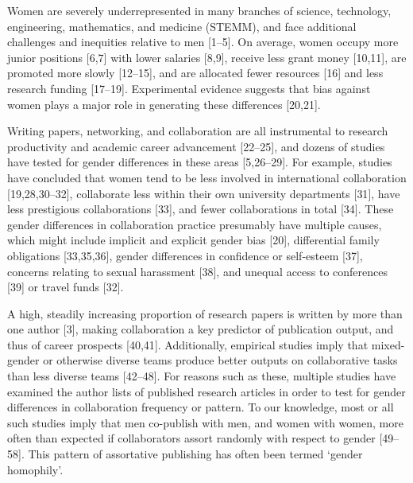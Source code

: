 \documentclass[12pt,]{article}
\begin{document}
Women are severely underrepresented in many branches of science,
technology, engineering, mathematics, and medicine (STEMM), and face
additional challenges and inequities relative to men {[}1--5{]}. On
average, women occupy more junior positions {[}6,7{]} with lower
salaries {[}8,9{]}, receive less grant money {[}10,11{]}, are promoted
more slowly {[}12--15{]}, and are allocated fewer resources {[}16{]} and
less research funding {[}17--19{]}. Experimental evidence suggests that
bias against women plays a major role in generating these differences
{[}20,21{]}.

Writing papers, networking, and collaboration are all instrumental to
research productivity and academic career advancement {[}22--25{]}, and
dozens of studies have tested for gender differences in these areas
{[}5,26--29{]}. For example, studies have concluded that women tend to
be less involved in international collaboration {[}19,28,30--32{]},
collaborate less within their own university departments {[}31{]}, have
less prestigious collaborations {[}33{]}, and fewer collaborations in
total {[}34{]}. These gender differences in collaboration practice
presumably have multiple causes, which might include implicit and
explicit gender bias {[}20{]}, differential family obligations
{[}33,35,36{]}, gender differences in confidence or self-esteem
{[}37{]}, concerns relating to sexual harassment {[}38{]}, and unequal
access to conferences {[}39{]} or travel funds {[}32{]}.

A high, steadily increasing proportion of research papers is written by
more than one author {[}3{]}, making collaboration a key predictor of
publication output, and thus of career prospects {[}40,41{]}.
Additionally, empirical studies imply that mixed-gender or otherwise
diverse teams produce better outputs on collaborative tasks than less
diverse teams {[}42--48{]}. For reasons such as these, multiple studies
have examined the author lists of published research articles in order
to test for gender differences in collaboration frequency or pattern. To
our knowledge, most or all such studies imply that men co-publish with
men, and women with women, more often than expected if collaborators
assort randomly with respect to gender {[}49--58{]}. This pattern of
assortative publishing has often been termed `gender homophily'.
\end{document}
